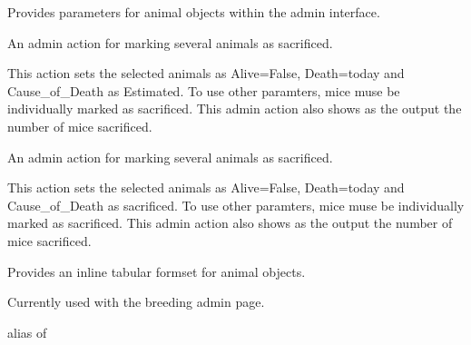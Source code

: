 \documentclass[letterpaper,10pt,english]{sphinxmanual}
\begin{document}
\begin{fulllineitems}
\label{animals:mousedb.animal.admin.AnimalAdmin}
Provides parameters for animal objects within the admin interface.

\begin{fulllineitems}
\label{animals:mousedb.animal.admin.AnimalAdmin.mark_estimated_death}
An admin action for marking several animals as sacrificed.

This action sets the selected animals as Alive=False, Death=today and Cause\_of\_Death as Estimated.  To use other paramters, mice muse be individually marked as sacrificed.
This admin action also shows as the output the number of mice sacrificed.

\end{fulllineitems}


\begin{fulllineitems}
\label{animals:mousedb.animal.admin.AnimalAdmin.mark_sacrificed}
An admin action for marking several animals as sacrificed.

This action sets the selected animals as Alive=False, Death=today and Cause\_of\_Death as sacrificed.  To use other paramters, mice muse be individually marked as sacrificed.
This admin action also shows as the output the number of mice sacrificed.

\end{fulllineitems}


\end{fulllineitems}


\begin{fulllineitems}
\label{animals:mousedb.animal.admin.AnimalInline}
Provides an inline tabular formset for animal objects.

Currently used with the breeding admin page.

\begin{fulllineitems}
\label{animals:mousedb.animal.admin.AnimalInline.model}
alias of 

\end{fulllineitems}


\end{fulllineitems}
\end{document}
